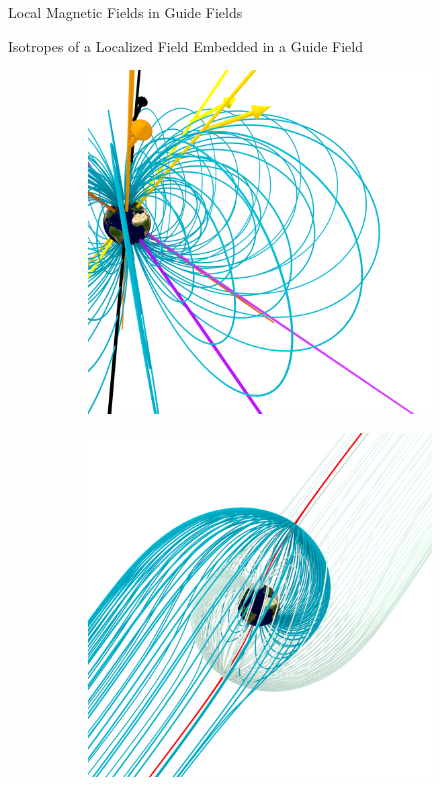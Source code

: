 \documentclass[final]{beamer}
\newlength{\onecolwid}
\begin{document}
\begin{frame}[t]
\begin{columns}[t]
\begin{column}{\onecolwid}
\begin{block}{\huge{Local Magnetic Fields in Guide Fields}}
\begin{block}{Isotropes of a Localized Field Embedded in a Guide Field}
  \begin{figure}
    \centering
    \begin{subfigure}[b]{.3\textwidth}
      \includegraphics[width=\textwidth]{fig/mainfig.png}
      \caption{}
    \end{subfigure}
    \begin{subfigure}[b]{.3\textwidth}
      \includegraphics[width=\textwidth]{fig/separatrix_dipole.png}

\end{subfigure}
\end{figure}
\end{block}
\end{block}
\end{column}
\end{columns}
\end{frame}
\end{document}

